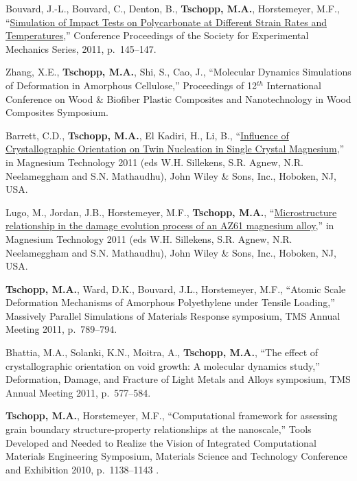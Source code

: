 \begin{cvlist}
\item 
Bouvard, J.-L., Bouvard, C., Denton, B., {\textbf{Tschopp, M.A.}},  Horstemeyer, M.F., ``\href{http://dx.doi.org/10.1007/978-1-4614-0213-8_21}{Simulation of Impact Tests on Polycarbonate at Different Strain Rates and Temperatures},'' Conference Proceedings of the Society for Experimental Mechanics Series, 2011, p.~145--147.

\item
{Zhang, X.E.}, \textbf{Tschopp, M.A.}, Shi, S., Cao, J., ``Molecular Dynamics Simulations of Deformation in Amorphous Cellulose,'' Proceedings of 12$^{th}$  International Conference on Wood \& Biofiber Plastic Composites and Nanotechnology in Wood Composites Symposium.

\item 
{Barrett, C.D.}, {\textbf{Tschopp, M.A.}}, El Kadiri, H., Li, B., ``\href{http://dx.doi.org/10.1002/9781118062029.ch56}{Influence of Crystallographic Orientation on Twin Nucleation in Single Crystal Magnesium},'' in Magnesium Technology 2011 (eds W.H. Sillekens, S.R. Agnew, N.R. Neelameggham and S.N. Mathaudhu), John Wiley \& Sons, Inc., Hoboken, NJ, USA.

\item
{Lugo, M.}, Jordan, J.B., Horstemeyer, M.F., \textbf{Tschopp, M.A.}, ``\href{http://dx.doi.org/10.1002/9781118062029.ch66}{Microstructure relationship in the damage evolution process of an AZ61 magnesium alloy},'' in Magnesium Technology 2011 (eds W.H. Sillekens, S.R. Agnew, N.R. Neelameggham and S.N. Mathaudhu), John Wiley \& Sons, Inc., Hoboken, NJ, USA.

\item
{\textbf{Tschopp, M.A.}}, Ward, D.K., Bouvard, J.L., Horstemeyer, M.F., ``Atomic Scale Deformation Mechanisms of Amorphous Polyethylene under Tensile Loading,'' Massively Parallel Simulations of Materials Response symposium, TMS Annual Meeting 2011, p.~789--794.

\item
{Bhattia, M.A.}, Solanki, K.N., Moitra, A., \textbf{Tschopp, M.A.}, ``The effect of crystallographic orientation on void growth: A molecular dynamics study,'' Deformation, Damage, and Fracture of Light Metals and Alloys symposium, TMS Annual Meeting 2011, p.~577--584.

\item
\textbf{Tschopp, M.A.}, Horstemeyer, M.F., ``Computational framework for assessing grain boundary structure-property relationships at the nanoscale,'' Tools Developed and Needed to Realize the Vision of Integrated Computational Materials Engineering Symposium, Materials Science and Technology Conference and Exhibition 2010, p.~1138--1143 .


\end{cvlist}
